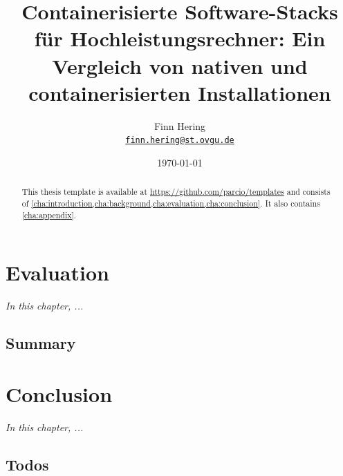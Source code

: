 \documentclass[
  12pt,
  a4paper,
  printlength,
  bibliography=totoc,
  chapterprefix,
  headings=openright,
  numbers=endperiod,
  parskip=half,
  twoside
]{scrreprt}
\title{Containerisierte Software-Stacks für Hochleistungsrechner: Ein Vergleich von nativen und containerisierten Installationen}
\author{
  Finn Hering\\
  {\large\href{mailto:finn.hering@st.ovgu.de}{\nolinkurl{finn.hering@st.ovgu.de}}}
}
\date{\today}
\begin{document}
\fussy
{}

\maketitle

\begin{abstract}
  \lipsum[1]

  This thesis template is available at \url{https://github.com/parcio/templates} and consists of \cref{cha:introduction,cha:background,cha:evaluation,cha:conclusion}.
  It also contains \cref{cha:appendix}.
\end{abstract}

\tableofcontents




\ifdraft{\cleardoubleoddpage}{}











\chapter{Evaluation}

\textit{In this chapter, ...}

\section*{Summary}

\lipsum[2]

\chapter{Conclusion}
\label{cha:conclusion}

\textit{In this chapter, ...}

\section{Todos}


\lipsum[1-2]
\end{document}
